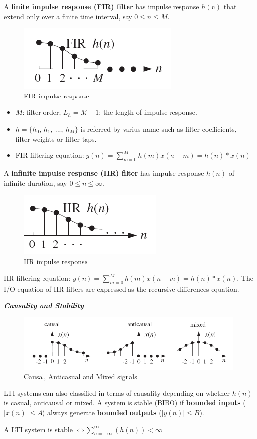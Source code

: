 \documentclass[11pt, a4paper]{article}
\begin{document}
A \textbf{finite impulse response (FIR) filter} has impulse response $h(n)$ that extend only over a finite time interval, say $0 \leq n \leq M$.
\begin{figure}[h!]
    \centering
    \includegraphics[width=0.3\linewidth]{img/35.png}
    \caption{FIR impulse response}
\end{figure}
\begin{itemize}
    \item $M$: filter order; $L_h=M+1$: the length of impulse response.
    \item $h=\{h_0,\ h_1,\ ...,\ h_M\}$ is referred by varius name such as filter coefficients, filter weights or filter taps.
    \item FIR filtering equation: $y(n) = \displaystyle\sum_{m=0}^{M}h(m)x(n-m)=h(n)*x(n) $
\end{itemize}
\newpage
A \textbf{infinite impulse response (IIR) filter} has impulse response $h(n)$ of infinite duration, say $0\leq n \leq\infty$.
\begin{figure}[h!]
    \centering
    \includegraphics[width=0.3\linewidth]{img/36.png}
    \caption{IIR impulse response}
\end{figure}

IIR filtering equation: $y(n) = \displaystyle\sum_{m=0}^{M}h(m)x(n-m)=h(n)*x(n) $. The I/O equation of IIR filters are expressed as the recursive differences equation.

\textit{\textbf{Causality and Stability}}

\begin{figure}[h!]
    \centering
    \includegraphics[width=0.5\linewidth]{img/37.png}
    \caption{Causal, Anticasual and Mixed signals}
\end{figure}

LTI systems can also classified in terms of causality depending on whether $h(n)$ is casual, anticausal or mixed. A system is stable (BIBO) if \textbf{bounded inputs} ($|x(n)| \leq A$) always generate \textbf{bounded outputs} ($|y(n)| \leq B$).

A LTI system is stable $\Leftrightarrow \displaystyle \sum_{n=-\infty}^{\infty} (h(n))<\infty$
\end{document}
